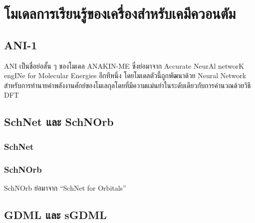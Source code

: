 

\chapter{โมเดลการเรียนรู้ของเครื่องสำหรับเคมีควอนตัม}
\label{ch:chem_ml}

\section{ANI-1}

ANI เป็นชื่อย่อสั้น ๆ ของโมเดล ANAKIN-ME ซึ่งย่อมาจาก Accurate NeurAl networK engINe for Molecular Energies อีกทีหนึ่ง 
โดยโมเดลตัวนี้ถูกพัฒนาด้วย Neural Network สำหรับการทำนายค่าพลังงานศักย์ของโมเลกุลโดยที่มีความแม่นยำในระดับเดียวกับการคำนวณด้วยวิธี 
DFT\autocite{smith2017a}

\section{SchNet และ SchNOrb}

\subsection{SchNet}

\autocite{schutt2017,schutt2018}

\subsection{SchNOrb}

SchNOrb ย่อมาจาก \enquote{SchNet for Orbitals}\autocite{schutt2019a}

\section{GDML และ sGDML}

